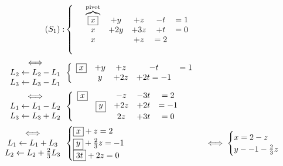 \newcommand{\bx}[1]{\fbox{$#1$}}
\let\larr\leftarrow

\begin{exm}
	\begin{align*}
		(S_1): &\left\{\begin{array}{c c c c c}
			\quad \overbrace{\fbox{$x$}}^{\text{pivot}} &+ y &+ z &- t &= 1\\
			\quad x &+ 2y &+ 3z &+ t &= 0 \\
			\quad x &&+ z &= 2 \\
			\quad
		\end{array}\right.\\
		\begin{array}{c}
			\iff\\
			L_2 \leftarrow L_2 - L_1\\
			L_3 \leftarrow L_3 - L_1
		\end{array}
		&\left\{\begin{array}{c c c c c}
			\fbox{$x$} &+ y &+ z &- t &= 1\\
			&y &+2z &+2t = -1\\
		\end{array}\right.\\
		\begin{array}{c}
			\iff\\
			L_1 \leftarrow L_1 - L_2\\
			L_3 \leftarrow L_3 + L_2
		\end{array}
		&\left\{
		\begin{array}
			{c c c c c}
			\fbox{$x$} &&-z &-3t &=2\\
			& \fbox{$y$} &+2z &+2t &=-1\\
			&&2z &+3t &= 0\\
		\end{array}
		\right.\\
		\begin{array}{c}
			\iff\\
			L_1 \leftarrow L_1 + L_3\\
			L_2 \leftarrow L_2 + \frac{2}{3} L_3
		\end{array}
		&\begin{cases}
			\fbox{$x$} + z = 2\\
			\fbox{$y$} + \frac{2}{3}z = -1\\
			\fbox{$3t$} + 2z = 0\\
		\end{cases}
		&\iff \begin{cases}
			x = 2 - z\\
			y - -1 - \frac{2}{3}z\\

\end{cases}
\end{align*}
\end{exm}

